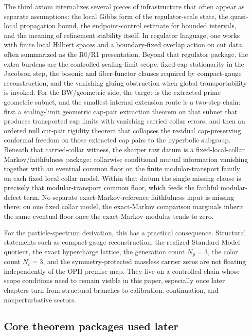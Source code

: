 \documentclass[11pt]{article}
\begin{document}
The third axiom internalizes several pieces of infrastructure that often appear as separate
assumptions: the local Gibbs form of the regulator-scale state, the
quasi-local propagation bound, the endpoint-control estimate for bounded intervals, and the
meaning of refinement stability itself. In regulator language, one works with finite local
Hilbert spaces and a boundary-fixed overlap action on cut data, often summarized as the R0/R1
presentation. Beyond that regulator package, the extra burdens are the controlled scaling-limit
scope, fixed-cap stationarity in the Jacobson step, the bosonic and fiber-functor clauses
required by compact-gauge reconstruction, and the vanishing gluing obstruction when global
transportability is invoked.
For the BW/geometric side, the target is the extracted prime geometric subnet, and the
smallest internal extension route is a two-step chain: first a scaling-limit geometric cap-pair extraction
theorem on that subnet that produces transported cap limits with vanishing carried collar errors,
and then an ordered null cut-pair rigidity theorem that
collapses the residual cap-preserving conformal freedom on those extracted cap pairs to the
hyperbolic subgroup. Beneath that carried-collar witness, the sharper raw datum is a fixed-local-collar
Markov/faithfulness package: collarwise conditional mutual information vanishing together with an
eventual common floor on the finite modular-transport family on each fixed local collar model. Within that datum the
single missing clause is precisely that modular-transport common floor, which feeds
the faithful modular-defect term. No separate exact-Markov-reference faithfulness input is
missing there: on one fixed collar model, the exact-Markov comparison marginals inherit the same
eventual floor once the exact-Markov modulus tends to zero.

For the particle-spectrum derivation, this has a practical consequence. Structural statements such
as compact-gauge reconstruction, the realized Standard Model quotient, the exact hypercharge
lattice, the generation count \(N_g=3\), the color count \(N_c=3\), and the symmetry-protected
massless carrier zeros are not floating independently of the OPH premise map. They live on a
controlled chain whose scope conditions need to remain visible in this paper,
especially once later chapters turn from structural branches to calibration, continuation, and
nonperturbative sectors.

\subsection{Core theorem packages used later}
\end{document}

